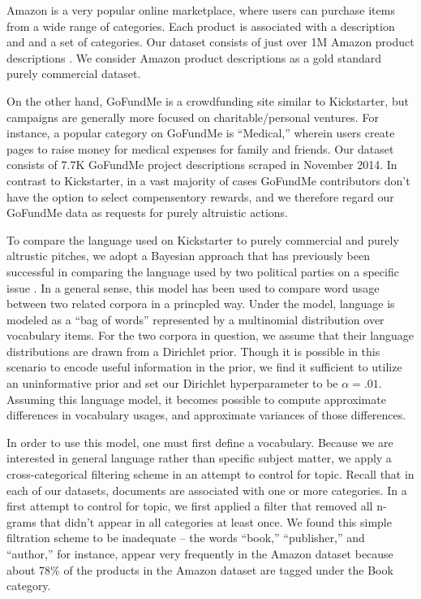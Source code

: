 \documentclass[letterpaper]{article}
\begin{document}
Amazon is a very popular online marketplace, where users can purchase items from a wide range of categories. Each product is associated with a description and and a set of categories. Our dataset consists of just over 1M Amazon product descriptions \cite{mcauley2013hidden}. We consider Amazon product descriptions as a gold standard purely commercial dataset.

On the other hand, GoFundMe is a crowdfunding site similar to Kickstarter, but campaigns are generally more focused on charitable/personal ventures. For instance, a popular category on GoFundMe is ``Medical,'' wherein users create pages to raise money for medical expenses for family and friends. Our dataset consists of 7.7K GoFundMe project descriptions scraped in November 2014. In contrast to Kickstarter, in a vast majority of cases GoFundMe contributors don't have the option to select compensentory rewards, and we therefore regard our GoFundMe data as requests for purely altruistic actions.

To compare the language used on Kickstarter to purely commercial and purely altrustic pitches, we adopt a Bayesian approach that has previously been successful in comparing the language used by two political parties on a specific issue \cite{monroe2008fightin}. In a general sense, this model has been used to compare word usage between two related corpora in a princpled way. Under the model, language is modeled as a ``bag of words'' represented by a multinomial distribution over vocabulary items. For the two corpora in question, we assume that their language distributions are drawn from a Dirichlet prior. Though it is possible in this scenario to encode useful information in the prior, we find it sufficient to utilize an uninformative prior and set our Dirichlet hyperparameter to be $\alpha=.01$. Assuming this language model, it becomes possible to compute approximate differences in vocabulary usages, and approximate variances of those differences.

In order to use this model, one must first define a vocabulary. Because we are interested in general language rather than specific subject matter, we apply a cross-categorical filtering scheme in an attempt to control for topic. Recall that in each of our datasets, documents are associated with one or more categories. In a first attempt to control for topic, we first applied a filter that removed all n-grams that didn't appear in all categories at least once. We found this simple filtration scheme to be inadequate -- the words ``book,'' ``publisher,'' and ``author,'' for instance, appear very frequently in the Amazon dataset because about 78\% of the products in the Amazon dataset are tagged under the Book category.
\end{document}
